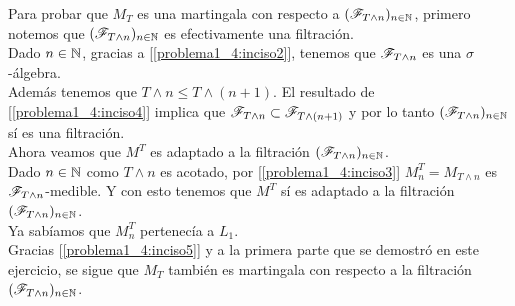 	Para probar que $M_T$ es una martingala con respecto a $(\mathscr{F}_{T \wedge n})_{n \in \mathbb{N}}$, primero notemos que
	$(\mathscr{F}_{T \wedge n})_{n \in \mathbb{N}}$ es efectivamente una filtración.\\
	
	Dado $n \in \mathbb{N}$, gracias a [\ref{problema1_4:inciso2}], tenemos que $\mathscr{F}_{T \wedge n}$ es una $\sigma$-álgebra.\\

	Además tenemos que $T \wedge n \leq T \wedge (n+1)$. El resultado de [\ref{problema1_4:inciso4}] implica que 
	$\mathscr{F}_{T \wedge n} \subset \mathscr{F}_{T \wedge (n+1)}$ y por lo tanto $(\mathscr{F}_{T \wedge n})_{n \in \mathbb{N}}$ sí es una filtración.\\
	
	Ahora veamos que $M^T$ es adaptado a la filtración $(\mathscr{F}_{T \wedge n})_{n \in \mathbb{N}}$.\\

	Dado $n \in \mathbb{N}$ como $T \wedge n$ es acotado, por [\ref{problema1_4:inciso3}] $M_n^T = M_{T \wedge n}$ es $\mathscr{F}_{T \wedge n}$-medible.
	Y con esto tenemos que $M^T$ sí es adaptado a la filtración $(\mathscr{F}_{T \wedge n})_{n \in \mathbb{N}}$.\\
	
	Ya sabíamos que $M_n^T$ pertenecía a $L_1$.\\
	
	Gracias [\ref{problema1_4:inciso5}] y a la primera parte que se demostró en este ejercicio, se sigue que $M_T$ también es
	martingala con respecto a la filtración $(\mathscr{F}_{T \wedge n})_{n \in \mathbb{N}}$.\\
	
	
	